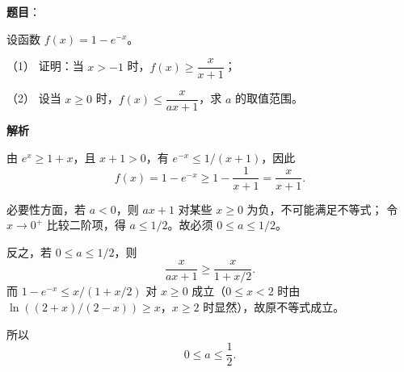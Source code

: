 \begin{answer}

\textbf{题目}：

设函数 $f(x)=1-e^{-x}$。

（1） 证明：当 $x>-1$ 时，$f(x)\geq\dfrac{x}{x+1}$；

（2） 设当 $x\geq0$ 时，$f(x)\leq\dfrac{x}{ax+1}$，求 $a$ 的取值范围。

\textbf{解析}


由 $e^x\geq1+x$，且 $x+1>0$，有 $e^{-x}\leq1/(x+1)$，因此
\nopagebreak[4]
\[
f(x)=1-e^{-x}\geq1-\frac1{x+1}=\frac{x}{x+1}.
\]


必要性方面，若 $a<0$，则 $ax+1$ 对某些 $x\geq0$ 为负，不可能满足不等式；
令 $x\to0^+$ 比较二阶项，得 $a\leq1/2$。故必须 $0\leq a\leq1/2$。

反之，若 $0\leq a\leq1/2$，则
\nopagebreak[4]
\[
\frac{x}{ax+1}\geq\frac{x}{1+x/2}.
\]
而 $1-e^{-x}\leq x/(1+x/2)$ 对 $x\geq0$ 成立（$0\leq x<2$ 时由
$\ln((2+x)/(2-x))\geq x$，$x\geq2$ 时显然），故原不等式成立。

所以
\nopagebreak[4]
\[
\boxed{0\leq a\leq\frac12}.
\]



\end{answer}
